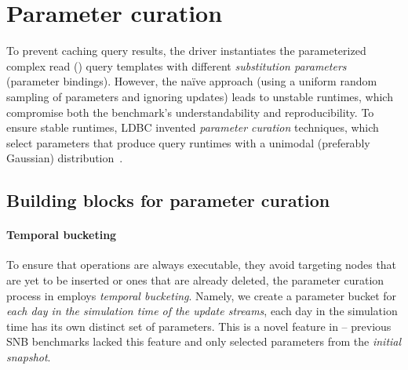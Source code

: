 \section{Parameter curation}
\label{sec:parameter-curation}


To prevent caching query results, the \snbinteractivevtwo driver instantiates the parameterized complex read (\CR) query templates with different \emph{substitution parameters} (\aka parameter bindings).
However, the na\"ive approach (using a uniform random sampling of parameters and ignoring updates)
leads to unstable runtimes,
which compromise both the benchmark's understandability and reproducibility.
To ensure stable runtimes, LDBC invented \emph{parameter curation} techniques, which select parameters that produce query runtimes with a unimodal (preferably Gaussian) distribution~\cite{DBLP:conf/tpctc/GubichevB14,DBLP:journals/pvldb/SzarnyasWSSBWZB22}.

\subsection{Building blocks for parameter curation}

\paragraph{Temporal bucketing}
\label{sec:temporal-bucketing}
%
To ensure that operations are always executable, \ie they avoid targeting nodes that are yet to be inserted or ones that are already deleted, the parameter curation process in \interactivevtwo employs \emph{temporal bucketing}.
Namely, we create a parameter bucket for \emph{each day in the simulation time of the update streams},
\ie each day in the simulation time has its own distinct set of parameters.
This is a novel feature in \interactivevtwo{} -- previous SNB benchmarks lacked this feature and only selected parameters from the \emph{initial snapshot}.

